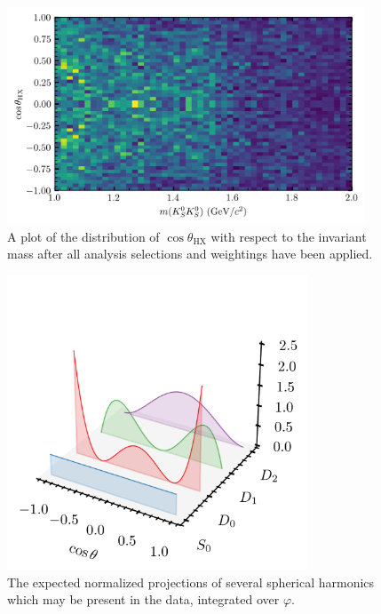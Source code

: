 \begin{figure}
  \begin{center}
    \includegraphics[width=0.95\textwidth]{figures/costheta_data_accpol_chisqdof_3.4_splot_D_1s_2b.png}
  \end{center}
  \caption{A plot of the distribution of $\cos\theta_\text{HX}$ with respect to the invariant mass after all analysis selections and weightings have been applied.}\label{fig:costheta-vs-mass}
\end{figure}

\begin{figure}
  \begin{center}
    \includegraphics[width=0.8\textwidth]{figures/spherical_harmonics.png}
  \end{center}
  \caption{The expected normalized projections of several spherical harmonics which may be present in the data, integrated over $\varphi$.}\label{fig:spherical-harmonics}
\end{figure}

